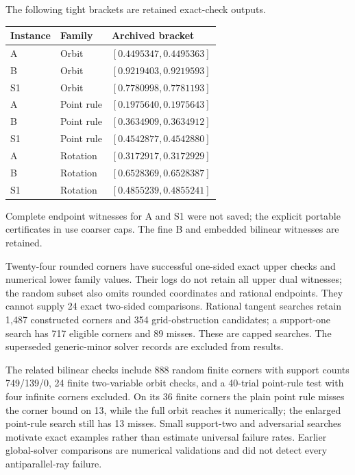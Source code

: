 The following tight brackets are retained exact-check outputs.
\begin{center}
\begin{tabular}{@{}lll@{}}
\toprule
Instance & Family & Archived bracket \\
\midrule
A & Orbit & $[0.4495347, 0.4495363]$ \\
B & Orbit & $[0.9219403, 0.9219593]$ \\
S1 & Orbit & $[0.7780998, 0.7781193]$ \\
A & Point rule & $[0.1975640, 0.1975643]$ \\
B & Point rule & $[0.3634909, 0.3634912]$ \\
S1 & Point rule & $[0.4542877, 0.4542880]$ \\
A & Rotation & $[0.3172917, 0.3172929]$ \\
B & Rotation & $[0.6528369, 0.6528387]$ \\
S1 & Rotation & $[0.4855239, 0.4855241]$ \\
\bottomrule
\end{tabular}
\end{center}
Complete endpoint witnesses for A and S1 were not saved; the explicit
portable certificates in  use coarser caps.
The fine B and embedded bilinear witnesses are retained.

Twenty-four rounded corners have successful one-sided exact upper
checks and numerical lower family values. Their logs do not retain
all upper dual witnesses; the random subset also omits rounded
coordinates and rational endpoints. They cannot supply 24 exact
two-sided comparisons. Rational tangent searches retain 1,487
constructed corners and 354 grid-obstruction candidates; a support-one
search has 717 eligible corners and 89 misses. These are capped searches.
The superseded generic-minor solver records are excluded from results.

The related bilinear checks include 888 random finite corners with
support counts 749/139/0, 24 finite two-variable orbit checks, and a
40-trial point-rule test with four infinite corners excluded. On its
36 finite corners the plain point rule misses the corner bound on 13,
while the full orbit reaches it numerically; the enlarged point-rule
search still has 13 misses. Small support-two and adversarial searches
motivate exact examples rather than estimate universal failure rates.
Earlier global-solver comparisons are numerical validations and did not
detect every antiparallel-ray failure.


